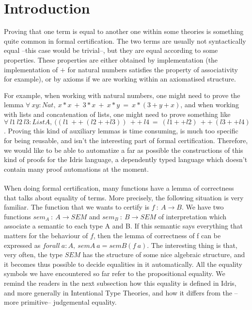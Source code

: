 \section{Introduction}

Proving that one term is equal to another one within some theories is something quite common in formal certification. The two terms are usually not syntactically equal --this case would be trivial--, but they are equal according to some properties. These properties are either obtained by implementation (the implementation of $+$ for natural numbers satisfies the property of associativity for example), or by axioms if we are working within an axiomatised structure. 

For example, when working with natural numbers, one might need to prove the lemma $\forall\ xy:Nat,\ x*x\ +\ 3*x\ +\ x*y\ =\ x*(3+y+x)$, and when working with lists and concatenation of lists, one might need to prove something like $\forall\ l1\ l2\ l3:List A,\ ((l1\ ++\ (l2 ++ l3))\ ++\ l4\ =\ (l1++l2)\ ++\ (l3++l4)$. Proving this kind of auxiliary lemmas is time consuming, is much too specific for being reusable, and isn't the interesting part of formal certification. Therefore, we would like to be able to automatize a far as possible the constructions of this kind of proofs for the Idris language, a dependently typed language which doesn't contain many proof automations at the moment. \\
\\
When doing formal certification, many functions have a lemma of correctness that talks about equality of terms. More precisely, the following situation is very familiar. The function that we wants to certify is $f\ :\ A \rightarrow B$. We have two functions $sem_A\ :\ A \rightarrow SEM$ and $sem_B\ : \ B \rightarrow SEM$ of interpretation which associate a semantic to each type A and B. If this semantic says everything that matters for the behaviour of $f$, then the lemma of correctness of f can be expressed as $forall\ a:A,\ semA\ a = semB (f\ a)$. The interesting thing is that, very often, the type $SEM$ has the structure of some nice algebraic structure, and it becomes thus possible to decide equalities in it automatically.
All the equality symbols we have encountered so far refer to the propositional equality. We remind the readers in the next subsection how this equality is defined in Idris, and more generally in Intentional Type Theories, and how it differs from the --more primitive-- judgemental equality.

